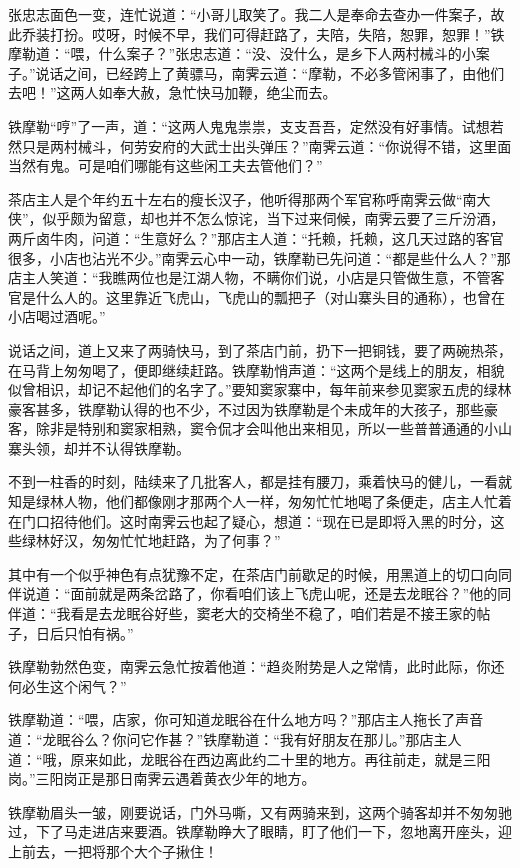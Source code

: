 \documentclass[12pt,oneside]{book}
\begin{document}
张忠志面色一变，连忙说道：``小哥儿取笑了。我二人是奉命去查办一件案子，故此乔装打扮。哎呀，时候不早，我们可得赶路了，夫陪，失陪，恕罪，恕罪！''铁摩勒道：``喂，什么案子？''张忠志道：``没、没什么，是乡下人两村械斗的小案子。''说话之间，已经跨上了黄骠马，南霁云道：``摩勒，不必多管闲事了，由他们去吧！''这两人如奉大赦，急忙快马加鞭，绝尘而去。

铁摩勒``哼''了一声，道：``这两人鬼鬼祟祟，支支吾吾，定然没有好事情。试想若然只是两村械斗，何劳安府的大武士出头弹压？''南霁云道：``你说得不错，这里面当然有鬼。可是咱们哪能有这些闲工夫去管他们？''

茶店主人是个年约五十左右的瘦长汉子，他听得那两个军官称呼南霁云做``南大侠''，似乎颇为留意，却也并不怎么惊诧，当下过来伺候，南霁云要了三斤汾酒，两斤卤牛肉，问道：``生意好么？''那店主人道：``托赖，托赖，这几天过路的客官很多，小店也沾光不少。''南霁云心中一动，铁摩勒已先问道：``都是些什么人？''那店主人笑道：``我瞧两位也是江湖人物，不瞒你们说，小店是只管做生意，不管客官是什么人的。这里靠近飞虎山，飞虎山的瓢把子（对山寨头目的通称），也曾在小店喝过酒呢。''

说话之间，道上又来了两骑快马，到了茶店门前，扔下一把铜钱，要了两碗热茶，在马背上匆匆喝了，便即继续赶路。铁摩勒悄声道：``这两个是线上的朋友，相貌似曾相识，却记不起他们的名字了。''要知窦家寨中，每年前来参见窦家五虎的绿林豪客甚多，铁摩勒认得的也不少，不过因为铁摩勒是个未成年的大孩子，那些豪客，除非是特别和窦家相熟，窦令侃才会叫他出来相见，所以一些普普通通的小山寨头领，却并不认得铁摩勒。

不到一柱香的时刻，陆续来了几批客人，都是挂有腰刀，乘着快马的健儿，一看就知是绿林人物，他们都像刚才那两个人一样，匆匆忙忙地喝了条便走，店主人忙着在门口招待他们。这时南霁云也起了疑心，想道：``现在已是即将入黑的时分，这些绿林好汉，匆匆忙忙地赶路，为了何事？''

其中有一个似乎神色有点犹豫不定，在茶店门前歇足的时候，用黑道上的切口向同伴说道：``面前就是两条岔路了，你看咱们该上飞虎山呢，还是去龙眠谷？''他的同伴道：``我看是去龙眠谷好些，窦老大的交椅坐不稳了，咱们若是不接王家的帖子，日后只怕有祸。''

铁摩勒勃然色变，南霁云急忙按着他道：``趋炎附势是人之常情，此时此际，你还何必生这个闲气？''

铁摩勒道：``喂，店家，你可知道龙眠谷在什么地方吗？''那店主人拖长了声音道：``龙眠谷么？你问它作甚？''铁摩勒道：``我有好朋友在那儿。''那店主人道：``哦，原来如此，龙眠谷在西边离此约二十里的地方。再往前走，就是三阳岗。''三阳岗正是那日南霁云遇着黄衣少年的地方。

铁摩勒眉头一皱，刚要说话，门外马嘶，又有两骑来到，这两个骑客却并不匆匆驰过，下了马走进店来要酒。铁摩勒睁大了眼睛，盯了他们一下，忽地离开座头，迎上前去，一把将那个大个子揪住！
\end{document}
